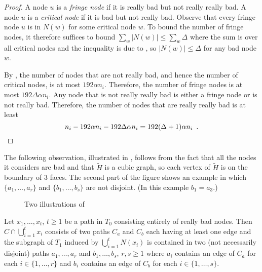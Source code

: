 \documentclass{patmorin}
\begin{document}
\begin{proof}
    A node $u$ is a \emph{fringe node} if it is really bad but not really really bad. A node $u$ is a \emph{critical node} if it is bad but not really bad.  Observe that every fringe node $u$ is in $N(w)$ for some critical node $w$.  To bound the number of fringe nodes, it therefore suffices to bound $\sum_{w}|N(w)|\le\sum_{w}\Delta$ where the sum is over all critical nodes and the inequality is due to , so $|N(w)|\le\Delta$ for any bad node $w$.

    By , the number of nodes that are not really bad, and hence the number of critical nodes, is at most $192\alpha n_i$.  Therefore, the number of fringe nodes is at most $192\Delta\alpha n_i$.
    Any node that is not really really bad is either a fringe node or is not really bad.  Therefore, the number of nodes that are really really bad is at least
    \[
        n_i - 192\alpha n_i - 192\Delta\alpha n_i = 192(\Delta+1)\alpha n_i \enspace . \qedhere
    \]
\end{proof}

The following observation, illustrated in , follows from the fact that all the nodes it considers are bad and that $\tilde{H}$ is a cubic graph, so each vertex of $\tilde{H}$ is on the boundary of 3 faces. The second part of the figure shows an example in which $\{a_1,\ldots,a_r\}$ and $\{b_1,\ldots,b_s\}$ are not disjoint. (In this example $b_1=a_3$.)

\begin{figure}
    \caption{Two illustrations of }
\end{figure}


\begin{obs}
    Let $x_1,\ldots,x_t$, $t\ge 1$ be a path in $T_0$ consisting entirely of really bad nodes.  Then $C\cap\bigcup_{i=1}^t x_i$ consists of two paths $C_a$ and $C_b$ each having at least one edge and the subgraph of $T_1$ induced by $\bigcup_{i=1}^t N(x_i)$ is contained in two (not necessarily disjoint) paths $a_1,\ldots,a_r$ and $b_1,\ldots,b_s$, $r,s\ge 1$ where $a_i$ contains an edge of $C_a$ for each $i\in\{1,\ldots,r\}$ and $b_i$ contains an edge of $C_b$ for each $i\in\{1,\ldots,s\}$.
\end{obs}
\end{document}
